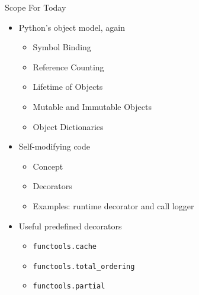 \begin{frame}{Scope For Today}
%
\begin{itemize}
\item Python's object model, again
	\begin{itemize}
	\item Symbol Binding
	\item Reference Counting
	\item Lifetime of Objects
	\item Mutable and Immutable Objects
	\item Object Dictionaries
	\end{itemize}
\item Self-modifying code
	\begin{itemize}
	\item Concept
	\item Decorators
	\item Examples: runtime decorator and call logger
	\end{itemize}
\item Useful predefined decorators
	\begin{itemize}
	\item \texttt{functools.cache}
	\item \texttt{functools.total\_ordering}
	\item \texttt{functools.partial}
	\end{itemize}
\end{itemize}
%
\end{frame}


